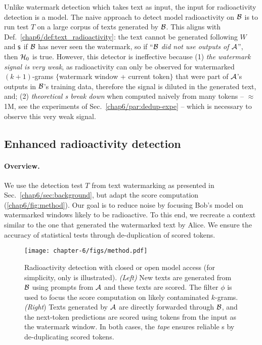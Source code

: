 Unlike watermark detection which takes text as input, the input for radioactivity detection is a model.
The naive approach to detect model radioactivity on $\mathcal B$ is to run test $T$ on a large corpus of texts generated by $\mathcal B$. 
This aligns with Def.~\ref{chap6/def:text_radioactivity}:
the text cannot be generated following $W$ and $\mathsf{s}$ if $\mathcal B$ has never seen the watermark, so if ``\textit{$\mathcal B$ did not use outputs of $\mathcal A$}'', then $\mathcal{H}_0$ is true.
However, this detector is ineffective because 
(1) \emph{the watermark signal is very weak}, as radioactivity can only be observed for watermarked $(k+1)$-grams $\{$watermark window + current token$\}$ that were part of $\mathcal A$'s outputs in $\mathcal B$'s training data, therefore the signal is diluted in the generated text, and;
(2) \emph{theoretical \pval s break down} when computed naively from many tokens -- $\approx$ 1M, see the experiments of Sec.~\ref{chap6/par:dedup-expe} -- which is necessary to observe this very weak signal.

\subsection{Enhanced radioactivity detection}

\paragraph{Overview.} 
We use the detection test $T$ from text watermarking as presented in Sec.~\ref{chap6/sec:background}, but adapt the score computation (\autoref{chap6/fig:method}).
Our goal is to reduce noise by focusing Bob's model on watermarked windows likely to be radioactive. 
To this end, we recreate a context similar to the one that generated the watermarked text by Alice. 
We ensure the accuracy of statistical tests through de-duplication of scored tokens. 

\begin{figure*}[b!]
    \centering
    \texttt{[image: chapter-6/figs/method.pdf]}
    \caption{
    Radioactivity detection with closed or open model access (for simplicity, only \citep{kirchenbauer2023watermark} is illustrated).
    \textit{(Left)} New texts are generated from $\mathcal B$ using prompts from $\mathcal A$ and these texts are scored. 
    The filter $\phi$ is used to focus the score computation on likely contaminated $k$-grams. 
    \textit{(Right}) Texts generated by $\mathcal A$ are directly forwarded through $\mathcal B$, and the next-token predictions are scored using tokens from the input as the watermark window.
    In both cases, the \textit{tape} ensures reliable \pval s by de-duplicating scored tokens.
    }
    \label{chap6/fig:method}\label{chap6/fig:open_model}
\end{figure*}


